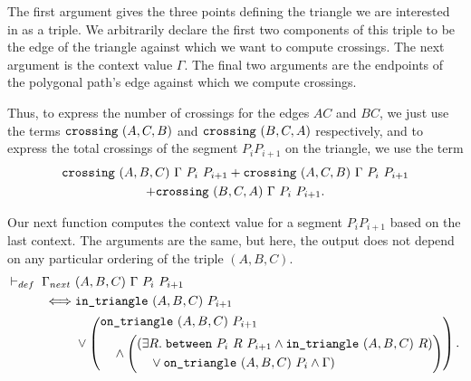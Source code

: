 The first argument gives the three points defining the triangle we are interested in as a triple. We arbitrarily declare the first two components of this triple to be the edge of the triangle against which we want to compute crossings. The next argument is the context value $\Gamma$. The final two arguments are the endpoints of the polygonal path's edge against which we compute crossings.

Thus, to express the number of crossings for the edges $AC$ and $BC$, we just use the terms $\texttt{crossing}\ (A,C,B)$ and $\texttt{crossing}\ (B,C,A)$ respectively, and to express the total crossings of the segment $P_iP_{i+1}$ on the triangle, we use the term
\begin{multline*}
\texttt{crossing}\ (A,B,C)\ \Gamma\ P_i\ P_{i+1} + \texttt{crossing}\ (A,C,B)\ \Gamma\ P_i\ P_{i+1}\\ + \texttt{crossing}\ (B,C,A)\ \Gamma\ P_i\ P_{i+1}.
\end{multline*}

Our next function computes the context value for a segment $P_iP_{i+1}$ based on the last context. The arguments are the same, but here, the output does not depend on any particular ordering of the triple $(A,B,C)$.
\begin{equation*}
\begin{split}
\vdash_{def}\;\Gamma_{next}\ &(A,B,C)\ \Gamma\ P_i\ P_{i+1} \\
\iff &\texttt{in\_triangle}\ (A,B,C)\ P_{i+1}\\
& \vee \left(\begin{aligned}&\texttt{on\_triangle}\ (A,B,C)\ P_{i+1}\\
& \quad \wedge \left(\begin{aligned}&(\exists R.\; \texttt{between}\ P_i\ R\ P_{i+1} \wedge \texttt{in\_triangle}\ (A,B,C)\ R)\\
& \quad\vee \texttt{on\_triangle}\ (A,B,C)\ P_i \wedge \Gamma)\end{aligned}\right)\end{aligned}\right).
\end{split}
\end{equation*}

